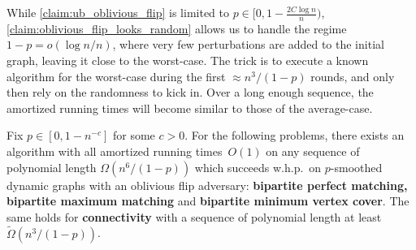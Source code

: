 \documentclass[letter,11pt]{article}
\begin{document}
While \cref{claim:ub_oblivious_flip}
is limited to $p\in[0,1-\frac{2C\log n}{n})$,
\cref{claim:oblivious_flip_looks_random} allows us to handle the regime $1-p = o(\log n / n)$, where very few perturbations are added to the initial graph, leaving it close to the worst-case.
The trick is to execute a known algorithm for the worst-case during the first $\approx n^3/(1-p)$ rounds, and only then rely on the randomness to kick in. Over a long enough sequence, the amortized running times will become similar to those of the average-case.

\begin{lemma}
    \label{lem:ub_oblivious_flip2}
    Fix $p \in [0,1-n^{-c}]$ for some $c > 0$. For the following problems, there exists an algorithm with all amortized running times~$O(1)$ on any sequence of polynomial length $\Omega\left(n^6/(1-p)\right)$ which succeeds w.h.p.\ on $p$-smoothed dynamic graphs with an oblivious flip adversary: \textbf{bipartite perfect matching, bipartite maximum matching} and \textbf{bipartite minimum vertex cover}.
    The same holds for \textbf{connectivity} with a sequence of polynomial length at least $\tilde{\Omega}\left(n^3/(1-p)\right)$.
\end{lemma}
\end{document}
